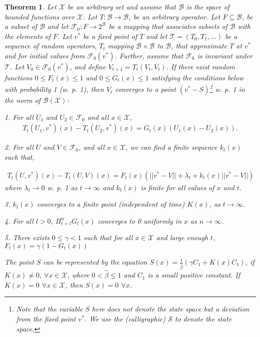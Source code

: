 \documentclass[jair, twoside,11pt,theapa]{article}
\newtheorem{theorem}{Theorem}
\begin{document}
\begin{theorem}\label{maintheorem}
Let $\mathscr{X}$ be an arbitrary set and assume that $\mathcal{B}$ is the space of bounded functions over $\mathscr{X}$. Let  $T:\mathcal{B} \xrightarrow{} \mathcal{B}$, be an arbitrary operator. Let $F \subseteq \mathcal{B} $, be a subset of $\mathcal{B}$ and let $\mathcal{F}_0: F \xrightarrow{} 2^{\mathcal{B}}$ be a mapping that associates subsets of $\mathcal{B}$ with the elements of $F$. Let $v^*$ be a fixed point of $T$ and let $\mathcal{T} = (T_0, T_1, \ldots)$ be a sequence of random operators, $T_t$ mapping $\mathcal{B}\times \mathcal{B}$ to $\mathcal{B}$, that approximate $T$ at $v^*$ and for initial values from $\mathcal{F}_0(v^*)$. Further, assume that $\mathcal{F}_0$ is invariant under $\mathcal{T}$. Let $V_0 \in \mathcal{F}_0(v^*)$, and define $V_{t+1} = T_t(V_t, V_t)$. If there exist random functions $0 \leq F_t(x) \leq 1$ and $0 \leq G_t(x) \leq 1$ satisfying the conditions below with probability 1 (w. p. 1), then $V_t$ converges to a point $(v^* - S)$\footnote{Note that the variable $S$ here does not denote the state space but a deviation from the fixed point $v^*$. We use the (calligraphic) $\mathcal{S}$ to denote the state space.} w. p. 1 in the norm of $\mathcal{B}(\mathscr{X})$:

1. For all $U_1$ and $U_2 \in \mathcal{F}_0$ and all $x \in \mathscr{X}$, 
\begin{equation*}
    \begin{array}{cc}
        T_t(U_1, v^*)(x) - T_t(U_2, v^*)(x)   
        =  G_t(x) (U_1(x) - U_2(x)).  
    \end{array}
\end{equation*}

2. For all $U$ and $V \in \mathcal{F}_0$, and all $x \in \mathscr{X}$, we can find a finite sequence $k_t(x)$ such that, 

\begin{equation*}
    \begin{array}{l}
         T_t(U,v^*)(x) - T_t(U,V)(x) 
          = F_t(x)(|| v^* - V|| + \lambda_t + k_t(x) ||v^* - V||)
    \end{array}
\end{equation*}
\noindent where $\lambda_t \xrightarrow{} 0$ w. p. 1 as $t \xrightarrow{} \infty$ and $k_t(x)$ is finite for all values of $x$ and $t$. 

3. $k_t(x)$ converges to a finite point (independent of time) $K(x)$, as $t \xrightarrow{} \infty$. 


4. For all $l>0$, $\Pi_{t=l}^n G_t(x)$ converges to 0 uniformly in $x$ as $n \xrightarrow{} \infty$.

5. There exists $0\leq \gamma < 1$ such that for all $x \in \mathscr{X}$ and large enough $t$, 
        $F_t(x) = \gamma(1-G_t(x))$


The point $S$ can be represented by the equation $S (x) = \frac{1}{\hat{\beta}} (\gamma C_1 + K(x) C_1) $, if $K(x) \neq 0$, $\forall x \in \mathscr{X}$, where $0 < \hat{\beta} \leq 1$ and $C_1$ is a small positive constant. If $K(x) = 0$ $\forall x \in \mathscr{X}$, then $S(x) = 0$ $\forall x$. 
\end{theorem}
\end{document}
